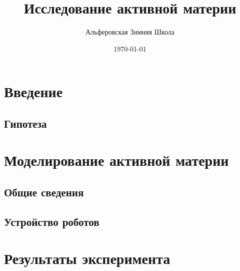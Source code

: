 \documentclass[aspectratio=169]{beamer}
\title{Исследование активной материи}
\author{Альферовская Зимняя Школа}
\date{\today}
\begin{document}
	\frame[plain]{\titlepage}
	
	\section{Введение}
	
	\begin{frame}
		\frametitle{\insertsection}
			
	\end{frame}
	
	\subsection{Гипотеза}
	\begin{frame}
		\frametitle{\insertsubsection}
				
	\end{frame}
	
	
	
	\section{Моделирование активной материи}
	\subsection{Общие сведения}
	
	\begin{frame}
		\frametitle{\insertsection}
		\framesubtitle{\insertsubsection}
		
	\end{frame}

	\subsection{Устройство роботов}
	
	\begin{frame}
		\frametitle{\insertsection}
		\framesubtitle{\insertsubsection}
	
	\end{frame}

	\section{Результаты эксперимента}
	\begin{frame}
		\frametitle{\insertsection}
		
	\end{frame}
	
	
\end{document}
